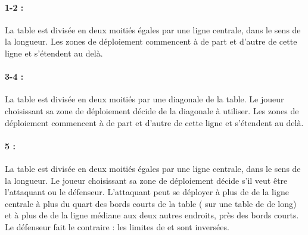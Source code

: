 \paragraph{1-2 : \frontlineclash{}}
\label{figure/deployment}
\begin{minipage}[c]{0.35\textwidth}
\def\svgwidth{\textwidth}

\end{minipage}\hfill
\begin{minipage}[c]{0.62\textwidth}
La table est divisée en deux moitiés égales par une ligne centrale, dans le sens de la longueur. Les zones de déploiement commencent à  de part et d'autre de cette ligne et s'étendent au delà. 
\end{minipage}

\paragraph{3-4 : }

\begin{minipage}[c]{0.35\textwidth}
\def\svgwidth{\textwidth}

\end{minipage}\hfill
\begin{minipage}[c]{0.62\textwidth}
La table est divisée en deux moitiés par une diagonale de la table. Le joueur choisissant sa zone de déploiement décide de la diagonale à utiliser. Les zones de déploiement commencent à  de part et d'autre de cette ligne et s'étendent au delà.
\end{minipage}

\paragraph{5 : \encircle{}}

\newcommand{\deploymentfigAttacker}{\flufffont{Attaquant}}
\newcommand{\deploymentfigDefender}{\flufffont{Défenseur}}
\begin{minipage}[c]{0.35\textwidth}
\def\svgwidth{\textwidth}

\end{minipage}\hfill
\begin{minipage}[c]{0.62\textwidth}
La table est divisée en deux moitiés égales par une ligne centrale, dans le sens de la longueur. Le joueur choisissant sa zone de déploiement décide s'il veut être l'attaquant ou le défenseur. L'attaquant peut se déployer à plus de  de la ligne centrale à plus du quart des bords courts de la table ( sur une table de  de long) et à plus de  de la ligne médiane aux deux autres endroits, près des bords courts. Le défenseur fait le contraire : les limites de  et  sont inversées.
\end{minipage}

